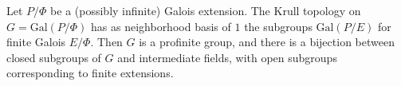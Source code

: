 Let $P/\Phi$ be a (possibly infinite) Galois extension. The Krull topology on $G = \text{Gal}(P/\Phi)$ has as neighborhood basis of $1$ the subgroups $\text{Gal}(P/E)$ for finite Galois $E/\Phi$. Then $G$ is a profinite group, and there is a bijection between closed subgroups of $G$ and intermediate fields, with open subgroups corresponding to finite extensions.
